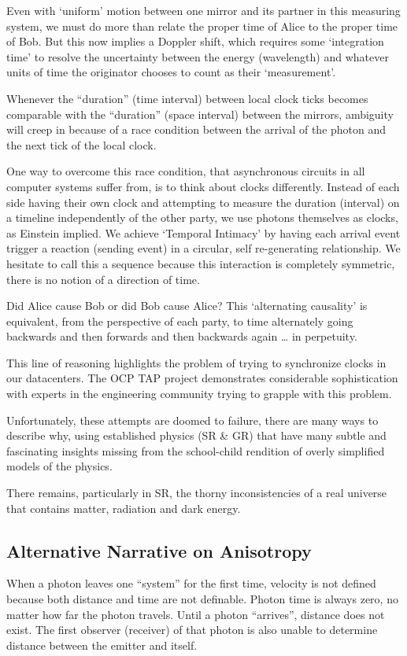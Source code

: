 \documentclass[../../../OAE-SPEC-MAIN.tex]{subfiles}
\begin{document}
Even with ‘uniform’ motion between one mirror and its partner in this measuring system, we must do more than relate the proper time of Alice to the proper time of Bob. But this now implies a Doppler shift, which requires some ‘integration time’ to resolve the uncertainty between the energy (wavelength) and whatever units of time the originator chooses to count as their ‘measurement’.

Whenever the “duration” (time interval) between local clock ticks becomes comparable with the “duration” (space interval) between the mirrors, ambiguity will creep in because of a race condition between the arrival of the photon and the next tick of the local clock.

One way to overcome this race condition, that asynchronous circuits in all computer systems suffer from, is to think about clocks differently. Instead of each side having their own clock and attempting to measure the duration (interval) on a timeline independently of the other party, we use photons themselves as clocks, as Einstein implied. We achieve ‘Temporal Intimacy’ by having each arrival event trigger a reaction (sending event) in a circular, self re-generating relationship. We hesitate to call this a sequence because this interaction is completely symmetric, there is no notion of a direction of time.

Did Alice cause Bob or did Bob cause Alice? This ‘alternating causality’ is equivalent, from the perspective of each party, to time alternately going backwards and then forwards and then backwards again …  in perpetuity.

This line of reasoning highlights the problem of trying to synchronize clocks in our datacenters. The OCP TAP project demonstrates considerable sophistication with experts in the engineering community trying to grapple with this problem.

Unfortunately, these attempts are doomed to failure, there are many ways to describe why, using established physics (SR \& GR) that have many subtle and fascinating insights missing from the school-child rendition of overly simplified models of the physics.

There remains, particularly in SR, the thorny inconsistencies of a real universe that contains matter, radiation and dark energy.

\subsection{Alternative Narrative on Anisotropy}
When a photon leaves one “system” for the first time, velocity is not defined because both distance and time are not definable. Photon time is always zero, no matter how far the photon travels. Until a photon “arrives”, distance does not exist. The first observer (receiver) of that photon is also unable to determine distance between the emitter and itself. 
\end{document}
